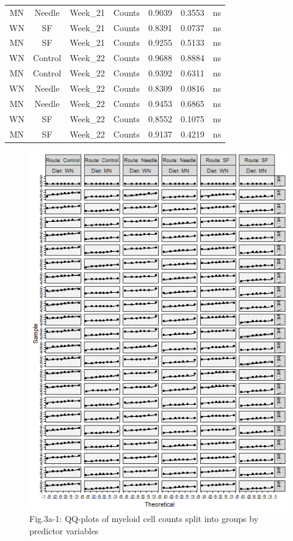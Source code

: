 \documentclass[
  12pt,
  letterpaper,
]{article}
\begin{document}
\begin{longtable}{ccclrrl}
MN & Needle & Week\_21 & Counts & 0.9039 & 0.3553 & ns \\ 
WN & SF & Week\_21 & Counts & 0.8391 & 0.0737 & ns \\ 
MN & SF & Week\_21 & Counts & 0.9255 & 0.5133 & ns \\ 
WN & Control & Week\_22 & Counts & 0.9688 & 0.8884 & ns \\ 
MN & Control & Week\_22 & Counts & 0.9392 & 0.6311 & ns \\ 
WN & Needle & Week\_22 & Counts & 0.8309 & 0.0816 & ns \\ 
MN & Needle & Week\_22 & Counts & 0.9453 & 0.6865 & ns \\ 
WN & SF & Week\_22 & Counts & 0.8552 & 0.1075 & ns \\ 
MN & SF & Week\_22 & Counts & 0.9137 & 0.4219 & ns \\ 
\bottomrule
\end{longtable}

\begin{figure}[H]

{\centering \includegraphics[width=0.95\linewidth,]{Statistics_report_files/figure-latex/qq-plot-figure-3a-1} 

}

\caption{Fig.3a-1: QQ-plots of myeloid cell counts split into groups by predictor variables}\label{fig:qq-plot-figure-3a}
\end{figure}
\end{document}
